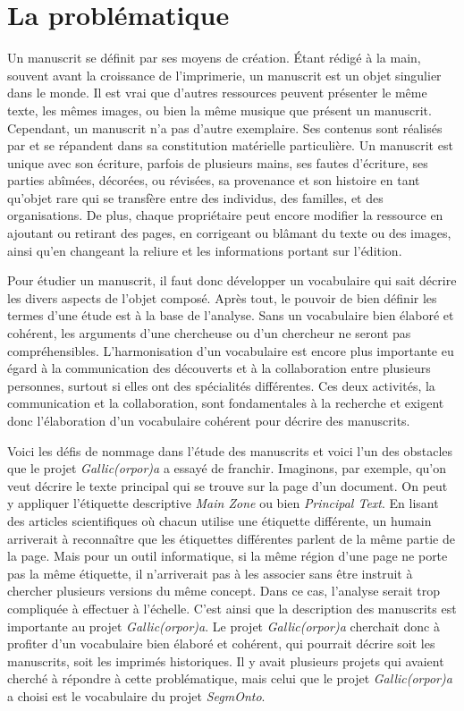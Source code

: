 \documentclass[class=article, crop=false]{standalone}
\begin{document}
	
\section{La problématique}
Un manuscrit se définit par ses moyens de création. Étant rédigé à la main, souvent avant la croissance de l'imprimerie, un manuscrit est un objet singulier dans le monde. Il est vrai que d'autres ressources peuvent présenter le même texte, les mêmes images, ou bien la même musique que présent un manuscrit. Cependant, un manuscrit n'a pas d'autre exemplaire. Ses contenus sont réalisés par et se répandent dans sa constitution matérielle particulière. Un manuscrit est unique avec son écriture, parfois de plusieurs mains, ses fautes d'écriture, ses parties abîmées, décorées, ou révisées, sa provenance et son histoire en tant qu'objet rare qui se transfère entre des individus, des familles, et des organisations. De plus, chaque propriétaire peut encore modifier la ressource en ajoutant ou retirant des pages, en corrigeant ou blâmant du texte ou des images, ainsi qu'en changeant la reliure et les informations portant sur l'édition.

Pour étudier un manuscrit, il faut donc développer un vocabulaire qui sait décrire les divers aspects de l'objet composé. Après tout, le pouvoir de bien définir les termes d'une étude est à la base de l'analyse. Sans un vocabulaire bien élaboré et cohérent, les arguments d'une chercheuse ou d'un chercheur ne seront pas compréhensibles. L'harmonisation d'un vocabulaire est encore plus importante eu égard à la communication des découverts et à la collaboration entre plusieurs personnes, surtout si elles ont des spécialités différentes. Ces deux activités, la communication et la collaboration, sont fondamentales à la recherche et exigent donc l'élaboration d'un vocabulaire cohérent pour décrire des manuscrits.

Voici les défis de nommage dans l'étude des manuscrits et voici l'un des obstacles que le projet \textit{Gallic(orpor)a} a essayé de franchir. Imaginons, par exemple, qu'on veut décrire le texte principal qui se trouve sur la page d'un document. On peut y appliquer l'étiquette descriptive \textit{Main Zone} ou bien \textit{Principal Text}. En lisant des articles scientifiques où chacun utilise une étiquette différente, un humain arriverait à reconnaître que les étiquettes différentes parlent de la même partie de la page. Mais pour un outil informatique, si la même région d'une page ne porte pas la même étiquette, il n'arriverait pas à les associer sans être instruit à chercher plusieurs versions du même concept. Dans ce cas, l'analyse serait trop compliquée à effectuer à l'échelle. C'est ainsi que la description des manuscrits est importante au projet \textit{Gallic(orpor)a}. Le projet \textit{Gallic(orpor)a} cherchait donc à profiter d'un vocabulaire bien élaboré et cohérent, qui pourrait décrire soit les manuscrits, soit les imprimés historiques. Il y avait plusieurs projets qui avaient cherché à répondre à cette problématique, mais celui que le projet \textit{Gallic(orpor)a} a choisi est le vocabulaire du projet \textit{SegmOnto}.
\end{document}

